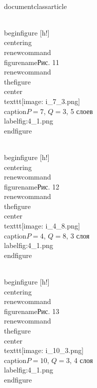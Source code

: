 \\documentclass{article}
\begin{document}
\\begin{figure} [h!]
    \\centering
    \\renewcommand{\\figurename}{Рис. 11}
    \\renewcommand{\\thefigure}{}
    \\center{\\texttt{[image: i\_7\_3.png]}}
    \\caption{$P=7$, $Q=3$, 5 слоев}
    \\label{fig:4_1.png}
\\end{figure}

\\begin{figure} [h!]
    \\centering
    \\renewcommand{\\figurename}{Рис. 12}
    \\renewcommand{\\thefigure}{}
    \\center{\\texttt{[image: i\_4\_8.png]}}
    \\caption{$P=4$, $Q=8$, 3 слоя}
    \\label{fig:4_1.png}
\\end{figure}

\\begin{figure} [h!]
    \\centering
    \\renewcommand{\\figurename}{Рис. 13}
    \\renewcommand{\\thefigure}{}
    \\center{\\texttt{[image: i\_10\_3.png]}}
    \\caption{$P=10$, $Q=3$, 4 слоя}
    \\label{fig:4_1.png}
\\end{figure}

\
\end{document}
